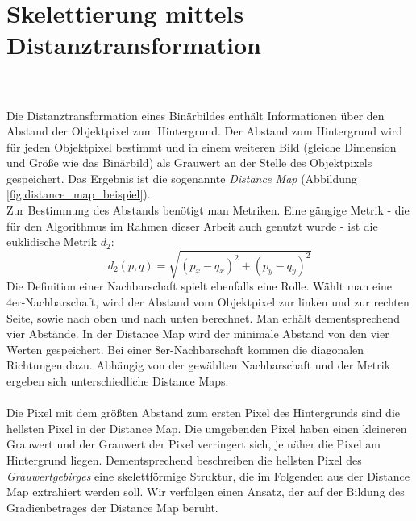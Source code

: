 \section{Skelettierung mittels Distanztransformation}
\label{sec:distanztransformation}
\\\\
Die Distanztransformation eines Binärbildes enthält Informationen über den Abstand der Objektpixel zum Hintergrund. Der Abstand zum Hintergrund wird für jeden Objektpixel bestimmt und in einem
weiteren Bild (gleiche Dimension und Größe wie das Binärbild) als Grauwert an der Stelle des Objektpixels gespeichert. Das Ergebnis ist die sogenannte \emph{Distance Map} (Abbildung \ref{fig:distance_map_beispiel}). \\
Zur Bestimmung des Abstands benötigt man Metriken. Eine gängige Metrik - die für den Algorithmus im Rahmen dieser Arbeit auch genutzt wurde - ist die euklidische Metrik $d_2$:
\begin{equation}
\label{eq:d2}
d_2(p,q) = \sqrt{(p_x - q_x)^2 + (p_y - q_y)^2}  
\end{equation}
Die Definition einer Nachbarschaft spielt
ebenfalls eine Rolle. Wählt man eine
4er-Nachbarschaft, wird der Abstand vom Objektpixel zur linken und zur rechten Seite, sowie nach oben und nach unten berechnet. Man erhält dementsprechend
vier Abstände. In der Distance Map wird der minimale Abstand von den vier Werten gespeichert. Bei einer 8er-Nachbarschaft
kommen die diagonalen Richtungen dazu. Abhängig von der gewählten
Nachbarschaft und der Metrik ergeben sich unterschiedliche Distance
Maps.\\\\
Die Pixel mit dem größten Abstand zum ersten Pixel des Hintergrunds sind die hellsten Pixel in der Distance Map. Die umgebenden Pixel haben einen kleineren Grauwert und der Grauwert der Pixel verringert sich, je näher die Pixel am Hintergrund liegen.
Dementsprechend beschreiben die hellsten Pixel des \emph{Grauwertgebirges} eine skelettförmige Struktur, die im Folgenden aus der Distance Map extrahiert werden soll.
Wir verfolgen einen Ansatz, der auf der Bildung des Gradienbetrages der Distance Map beruht.\\
